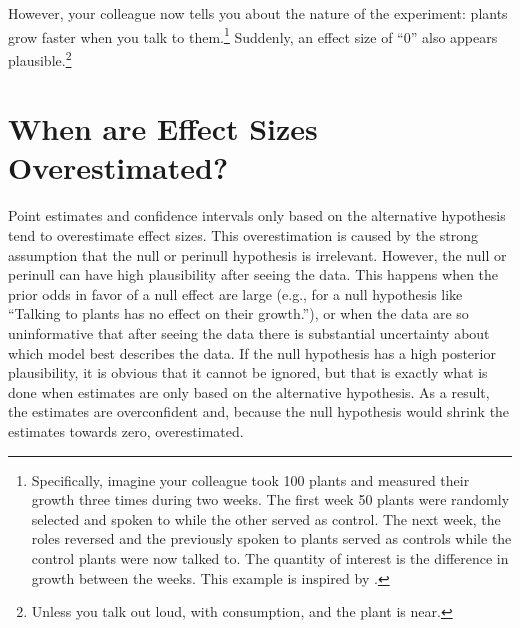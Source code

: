 \documentclass[a4paper]{article}
\begin{document}
However, your colleague now tells you about the nature of the experiment: plants grow faster when you talk to them.\footnote{Specifically, imagine your colleague took 100 plants and measured their growth three times during two weeks. The first week 50 plants were randomly selected and spoken to while the other served as control. The next week, the roles reversed and the previously spoken to plants served as controls while the control plants were now talked to. The quantity of interest is the difference in growth between the weeks. This example is inspired by \protect\cite{BergerDelampady1987}.} Suddenly, an effect size of ``0'' also appears plausible.\footnote{Unless you talk out loud, with consumption, and the plant is near.}

\section*{When are Effect Sizes Overestimated?}
Point estimates and confidence intervals only based on the alternative hypothesis tend to overestimate effect sizes. This overestimation is caused by the strong assumption that the null or perinull hypothesis is irrelevant. However, the null or perinull can have high plausibility after seeing the data. This happens when the prior odds in favor of a null effect are large (e.g., for a null hypothesis like ``Talking to plants has no effect on their growth.''), or when the data are so uninformative that after seeing the data there is substantial uncertainty about which model best describes the data. If the null hypothesis has a high posterior plausibility, it is obvious that it cannot be ignored, but that is exactly what is done when estimates are only based on the alternative hypothesis. As a result, the estimates are overconfident and, because the null hypothesis would shrink the estimates towards zero, overestimated.
\end{document}
